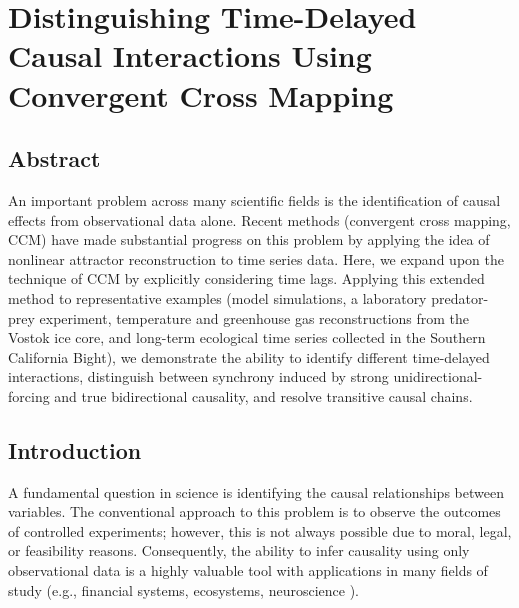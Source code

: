 \chapter{Distinguishing Time-Delayed Causal Interactions Using Convergent Cross Mapping}
\label{chap_ccm_time_delays}

\section{Abstract}
An important problem across many scientific fields is the identification of causal effects from observational data alone. Recent methods (convergent cross mapping, CCM) have made substantial progress on this problem by applying the idea of nonlinear attractor reconstruction to time series data. Here, we expand upon the technique of CCM by explicitly considering time lags. Applying this extended method to representative examples (model simulations, a laboratory predator-prey experiment, temperature and greenhouse gas reconstructions from the Vostok ice core, and long-term ecological time series collected in the Southern California Bight), we demonstrate the ability to identify different time-delayed interactions, distinguish between synchrony induced by strong unidirectional-forcing and true bidirectional causality, and resolve transitive causal chains. 

\section{Introduction}

A fundamental question in science is identifying the causal relationships between variables. The conventional approach to this problem is to observe the outcomes of controlled experiments; however, this is not always possible due to moral, legal, or feasibility reasons. Consequently, the ability to infer causality using only observational data is a highly valuable tool with applications in many fields of study (e.g., financial systems, ecosystems, neuroscience \cite{Granger_1969, Hiemstra_1994, Chen_2006, Sugihara_2012}).

